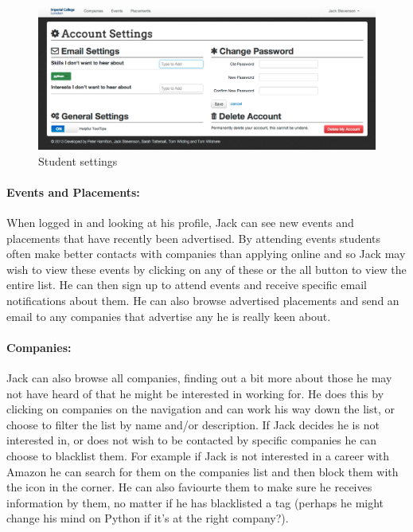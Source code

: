     \begin{figure}[H]\centering
    \includegraphics[scale=0.3]{images/user_experiences/student/account_settings}
    \caption{Student settings}
    \end{figure}

  \paragraph{Events and Placements:}
    When logged in and looking at his profile, Jack can see new events and placements that have recently been advertised. By attending events students often make better contacts with companies than applying online and so Jack may wish to view these events by clicking on any of these or the all button to view the entire list. He can then sign up to attend events and receive specific email notifications about them.
    He can also browse advertised placements and send an email to any companies that advertise any he is really keen about.


  \paragraph{Companies:}
    Jack can also browse all companies, finding out a bit more about those he may not have heard of that he might be interested in working for. He does this by clicking on companies on the navigation and can work his way down the list, or choose to filter the list by name and/or description.
    If Jack decides he is not interested in, or does not wish to be contacted by specific companies he can choose to blacklist them. For example if Jack is not interested in a career with Amazon he can search for them on the companies list and then block them with the icon in the corner. He can also faviourte them to make sure he receives information by them, no matter if he has blacklisted a tag (perhaps he might change his mind on Python if it's at the right company?).

